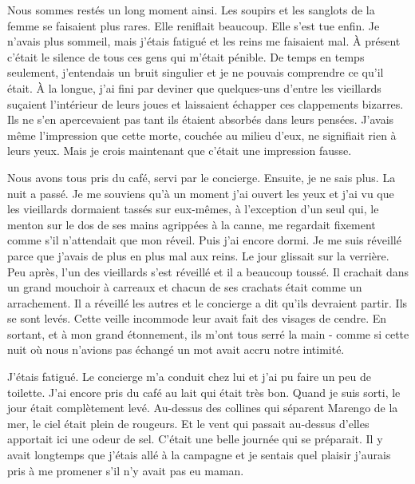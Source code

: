 \documentclass[french,twoside]{book} %
\begin{document}
Nous sommes restés un long moment ainsi. Les soupirs et les sanglots de la femme se faisaient plus rares. Elle reniflait beaucoup. Elle s’est tue enfin. Je n’avais plus sommeil, mais j’étais fatigué et les reins me faisaient mal. À présent c’était le silence de tous ces gens qui m’était pénible. De temps en temps seulement, j’entendais un bruit singulier et je ne pouvais comprendre ce qu’il était. À la longue, j’ai fini par deviner que quelques-uns d’entre les vieillards suçaient l’intérieur de leurs joues et laissaient échapper ces clappements bizarres. Ils ne s’en apercevaient pas tant ils étaient absorbés dans leurs pensées. J'avais même l’impression que cette morte, couchée au milieu d’eux, ne signifiait rien à leurs yeux. Mais je crois maintenant que c’était une impression fausse.\par
Nous avons tous pris du café, servi par le concierge. Ensuite, je ne sais plus. La nuit a passé. Je me souviens qu’à un moment j’ai ouvert les yeux et j’ai vu que les vieillards dormaient tassés sur eux-mêmes, à l’exception d’un seul qui, le menton sur le dos de ses mains agrippées à la canne, me regardait fixement comme s’il n’attendait que mon réveil. Puis j’ai encore dormi. Je me suis réveillé parce que j’avais de plus en plus mal aux reins. Le jour glissait sur la verrière. Peu après, l’un des vieillards s’est réveillé et il a beaucoup toussé. Il crachait dans un grand mouchoir à carreaux et chacun de ses crachats était comme un arrachement. Il a réveillé les autres et le concierge a dit qu’ils devraient partir. Ils se sont levés. Cette veille incommode leur avait fait des visages de cendre. En sortant, et à mon grand étonnement, ils m’ont tous serré la main - comme si cette nuit où nous n’avions pas échangé un mot avait accru notre intimité.\par
J'étais fatigué. Le concierge m’a conduit chez lui et j’ai pu faire un peu de toilette. J'ai encore pris du café au lait qui était très bon. Quand je suis sorti, le jour était complètement levé. Au-dessus des collines qui séparent Marengo de la mer, le ciel était plein de rougeurs. Et le vent qui passait au-dessus d’elles apportait ici une odeur de sel. C'était une belle journée qui se préparait. Il y avait longtemps que j’étais allé à la campagne et je sentais quel plaisir j’aurais pris à me promener s’il n’y avait pas eu maman.\par
\end{document}

